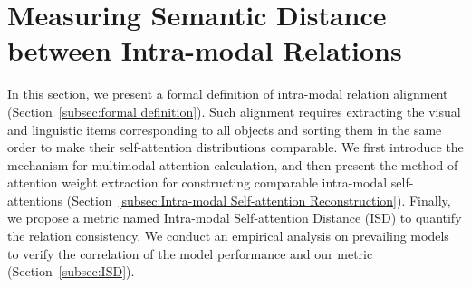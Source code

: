 \documentclass[11pt,a4paper]{article}
\begin{document}
\section{Measuring Semantic Distance between Intra-modal Relations}
In this section, we present a formal definition of intra-modal relation alignment (Section~\ref{subsec:formal definition}). 
Such alignment requires extracting the visual and linguistic items corresponding to all objects and sorting them in the same order to make their self-attention distributions comparable. 
We first introduce the mechanism for multimodal attention calculation, and then present the method of attention weight extraction for constructing comparable intra-modal self-attentions (Section~\ref{subsec:Intra-modal Self-attention Reconstruction}).  
Finally, we propose a metric named Intra-modal Self-attention Distance (ISD) to quantify the relation consistency. 
We conduct an empirical analysis on prevailing models to verify the correlation of the model performance and our metric (Section~\ref{subsec:ISD}). 
\end{document}
